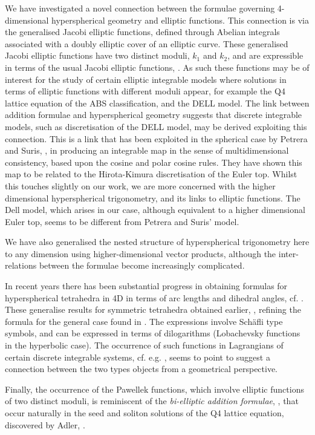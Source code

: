 \documentclass[fleqn,11pt,twoside]{article}
\theoremstyle{definition}
\begin{document}
We have investigated a novel connection between the formulae governing 4-dimensional hyperspherical geometry and elliptic functions. This connection is via the generalised Jacobi elliptic functions, defined through Abelian integrals associated with a doubly elliptic cover of an elliptic curve. These generalised Jacobi elliptic functions have two distinct moduli, $k_1$ and $k_2$, and are expressible in terms of the usual Jacobi elliptic functions, . As such these functions may be of interest for the study of certain elliptic integrable models where solutions in terms of elliptic functions with different moduli appear, for example the Q4 lattice equation of the ABS classification, and the DELL model. The link between addition formulae and hyperspherical geometry suggests that discrete integrable models, such as discretisation of the DELL model, may be derived exploiting this connection. This is a link that has been exploited in the spherical case by Petrera and Suris, \cite{Suris}, in producing an integrable map in the sense of multidimensional consistency, based upon the cosine and polar cosine rules. They have shown this map to be related to the Hirota-Kimura discretisation of the Euler top. Whilst this touches slightly on our work, we are more concerned with the higher dimensional hyperspherical trigonometry, and its links to elliptic functions. The Dell model, which arises in our case, although equivalent to a higher dimensional Euler top, seems to be different from Petrera and Suris' model.

We have also generalised the nested structure of hyperspherical trigonometry here to any dimension using higher-dimensional vector products, although the inter-relations between the formulae become increasingly complicated.

In recent years there has been substantial progress in obtaining 
formulas for hyperspherical tetrahedra in 4D in terms of arc lengths 
and dihedral angles, cf. \cite{Murakami,Murakami2,Murakami3}. 
These generalise results for symmetric tetrahedra obtained earlier,  
\cite{Derevnin,Derevnin2}, refining the formula for the general case 
found in \cite{ChoKim}. The expressions involve Sch\"afli type 
symbols, and can be expressed in terms of dilogarithms (Lobachevsky functions in the hyperbolic case).  The occurrence of such functions 
in Lagrangians of certain discrete integrable systems, cf. e.g. \cite{Lobb}, 
seems to point to suggest a connection between the two types 
objects from a geometrical perspective. 

Finally, the occurrence of the Pawellek functions, which involve 
elliptic functions of two distinct moduli, is reminiscent of the 
\textit{bi-elliptic addition formulae}, \cite{AHN}, that occur naturally in the 
seed and soliton solutions of the Q4 lattice equation, 
discovered by Adler, \cite{Adler}. 
\end{document}
